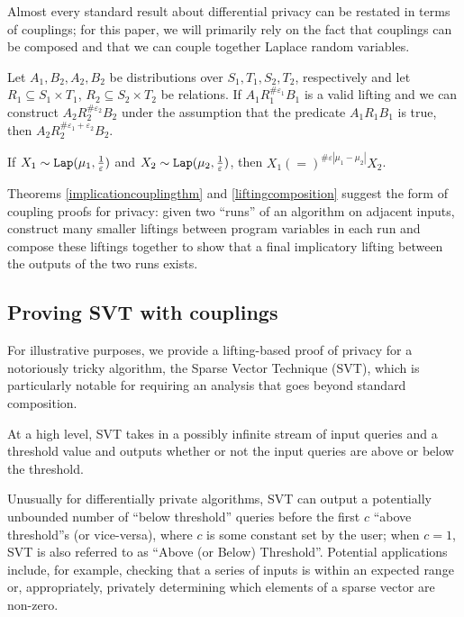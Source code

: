 Almost every standard result about differential privacy can be restated in terms of couplings; for this paper, we will primarily rely on the fact that couplings can be composed and that we can couple together Laplace random variables. 

\begin{thm}\label{liftingcomposition}
    Let $A_1, B_2, A_2, B_2$ be distributions over $S_1, T_1, S_2, T_2$, respectively and let $R_1\subseteq S_1\times T_1$, $R_2\subseteq S_2\times T_2$ be relations. If $A_1 R_1^{\#\varepsilon_1}B_1$ is a valid lifting and we can construct $A_2R_2^{\#\varepsilon_2}B_2$ under the assumption that the predicate $A_1 R_1 B_1$ is true, then $A_2 R_2^{\#\varepsilon_1+\varepsilon_2}B_2$.
\end{thm}


\begin{prop}
    If $X_1\sim\texttt{Lap}(\mu_1, \frac{1}{\varepsilon})$ and $X_2\sim\texttt{Lap}(\mu_2, \frac{1}{\varepsilon})$, then $X_1(=)^{\#\varepsilon|\mu_1-\mu_2|}X_2$.
\end{prop}


Theorems \ref{implicationcouplingthm} and \ref{liftingcomposition} suggest the form of coupling proofs for privacy: given two ``runs'' of an algorithm on adjacent inputs, construct many smaller liftings between program variables in each run and compose these liftings together to show that a final implicatory lifting between the outputs of the two runs exists. 

\subsection{Proving SVT with couplings}

For illustrative purposes, we provide a lifting-based proof of privacy for a notoriously tricky algorithm, the Sparse Vector Technique (SVT), which is particularly notable for requiring an analysis that goes beyond standard composition.

At a high level, SVT takes in a possibly infinite stream of input queries and a threshold value and outputs whether or not the input queries are above or below the threshold.

Unusually for differentially private algorithms, SVT can output a potentially unbounded number of ``below threshold'' queries before the first $c$ ``above threshold''s (or vice-versa), where $c$ is some constant set by the user; when $c=1$, SVT is also referred to as ``Above (or Below) Threshold''. Potential applications include, for example, checking that a series of inputs is within an expected range or, appropriately, privately determining which elements of a sparse vector are non-zero. 


